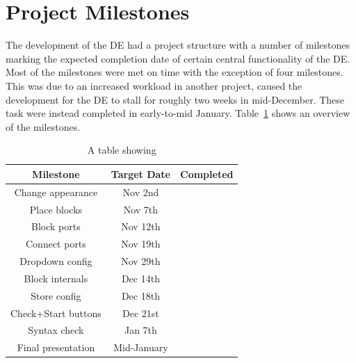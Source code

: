 \documentclass[journal,comsoc]{IEEEtran}
\begin{document}
%
\newpage
\appendices
\section{Project Milestones}
\label{app:milestones}
The development of the DE had a project structure with a number of milestones marking the
expected completion date of certain central functionality of the DE. Most of the milestones
were met on time with the exception of four milestones. This was due to an increased workload
in another project, caused the development for the DE to stall for roughly two weeks in
mid-December. These task were instead completed in early-to-mid January. Table~\ref{tab:milestones} shows an overview of the milestones.

\begin{table}[!ht]
\renewcommand{\arraystretch}{1.3}
\caption{A table showing}
\label{tab:milestones}
\centering
\begin{tabular}{|c|c|c|} \hline
		\textbf{Milestone} & \textbf{Target Date} & \textbf{Completed} \\ \hline
		Change appearance & Nov 2nd & \color{green}{In Time} \\ \hline
		Place blocks & Nov 7th & \color{green}{In Time} \\ \hline
		Block ports & Nov 12th & \color{green}{In Time} \\ \hline
		Connect ports & Nov 19th & \color{green}{In Time} \\ \hline
		Dropdown config & Nov 29th & \color{green}{In Time} \\ \hline
		Block internals & Dec 14th & \color{blue}{Early/Mid January} \\ \hline
		Store config & Dec 18th & \color{blue}{Early/Mid January} \\ \hline
		Check+Start buttons & Dec 21st & \color{blue}{Early/Mid January} \\ \hline
		Syntax check & Jan 7th & \color{blue}{Early/Mid January} \\ \hline
		Final presentation & Mid-January & \color{green}{Done} \\ \hline
\end{tabular}
\end{table}

\end{document}
